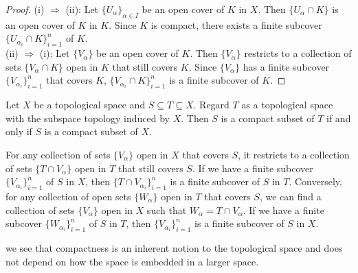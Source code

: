 \documentclass{report}
\begin{document}
\begin{proof}
	(i) $\Rightarrow$ (ii): Let $\{U_\alpha\}_{\alpha\in I
	}$ be an open cover of $K$ in $X$. Then $\{U_\alpha\cap K\}$ is an open cover of $K$ in $K$. Since $K$ is compact, there exists a finite subcover $\{U_{\alpha_i}\cap K\}_{i=1}^n$ of $K$.\\
	(ii) $\Rightarrow$ (i): Let $\{V_\alpha\}$ be an open cover of $K$. Then $\{V_\alpha\}$ restricts to a collection of sets $\{V_\alpha\cap K\}$ open in $K$ that still covers $K$. Since $\{V_\alpha\}$ has a finite subcover $\{V_{\alpha_i}\}_{i=1}^n$ that covers $K$, $\{V_{\alpha_i}\cap K\}_{i=1}^n$ is a finite subcover of $K$.
\end{proof}

\begin{lemma}{}{}
	Let $X$ be a topological space and $S \subseteq T \subseteq X$. Regard $T$ as a topological space with the subspace topology induced by $X$. Then $S$ is a compact subset of $T$ if and only if $S$ is a compact subset of $X$.
\end{lemma}

\begin{prf}
	For any collection of sets $\{V_\alpha\}$ open in $X$ that covers $S$, it restricts to a collection of sets $\{T\cap V_\alpha\}$ open in $T$ that still covers $S$. If we have a finite subcover $\{V_{\alpha_i}\}_{i=1}^n$ of $S$ in $X$, then $\{T\cap V_{\alpha_i}\}_{i=1}^n$ is a finite subcover of $S$ in $T$. Conversely, for any collection of open sets $\{W_\alpha\}$ open in $T$ that covers $S$, we can find a collection of sets $\{V_\alpha\}$ open in $X$ such that $W_\alpha=T\cap V_\alpha$. If we have a finite subcover $\{W_{\alpha_i}\}_{i=1}^n$ of $S$ in $T$, then $\{V_{\alpha_i}\}_{i=1}^n$ is a finite subcover of $S$ in $X$.
\end{prf}

we see that compactness is an inherent notion to the topological space and does not depend on how the space is embedded in a larger space.
\end{document}
